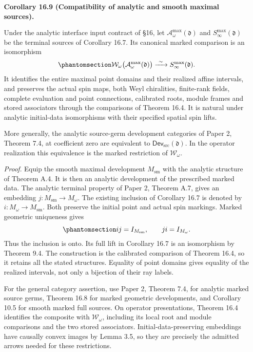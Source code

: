 \documentclass[
  english,
  11pt,
  reqno]{amsart}
\makeatletter
\newcommand{\pandocstatementheading}[1]{%
  \par\addpenalty{\@beginparpenalty}%
  \addvspace{.5\baselineskip plus .2\baselineskip minus .2\baselineskip}%
  {\normalfont\bfseries #1\par}%
  \nobreak\@afterindenttrue\@afterheading
}
\makeatother
\begin{document}
\pandocstatementheading{\protect{}\label{cor:analytic-smooth-maximal-source-isomorphism}Corollary 16.9 (Compatibility of analytic and smooth maximal sources).}

Under the analytic interface input contract of §16, let
\(\mathcal A^{\max}_\omega(\mathfrak d)\) and
\(S^{\max}_\infty(\mathfrak d)\) be the terminal sources of Corollary
16.7. Its canonical marked comparison is an isomorphism
\begin{equation}\protect\phantomsection\label{eq:analytic-smooth-maximal-source-isomorphism}{
\mathcal W_\omega\bigl(\mathcal A^{\max}_\omega(\mathfrak d)\bigr)
\xrightarrow{\ \sim\ }
S^{\max}_\infty(\mathfrak d).
}\end{equation} It identifies the entire maximal point domains and their
realized affine intervals, and preserves the actual spin maps, both Weyl
chiralities, finite-rank fields, complete evaluation and point
connections, calibrated roots, module frames and stored associators
through the comparisons of Theorem 16.4. It is natural under analytic
initial-data isomorphisms with their specified spatial spin lifts.

More generally, the analytic source-germ development categories of Paper
2, Theorem 7.4, at coefficient zero are equivalent to
\(\mathsf{Dev}_{\mathrm{src}}(\mathfrak d)\). In the operator
realization this equivalence is the marked restriction of
\(\mathcal W_\omega\).

\emph{Proof.} Equip the smooth maximal development \(M_{\mathrm{sm}}\)
with the analytic structure of Theorem A.4. It is then an analytic
development of the prescribed marked data. The analytic terminal
property of Paper 2, Theorem A.7, gives an embedding
\(j:M_{\mathrm{sm}}\to M_\omega\). The existing inclusion of Corollary
16.7 is denoted by \(i:M_\omega\to M_{\mathrm{sm}}\). Both preserve the
initial point and actual spin markings. Marked geometric uniqueness
gives
\begin{equation}\protect\phantomsection\label{eq:analytic-smooth-terminal-inverses}{
ij=I_{M_{\mathrm{sm}}},
\qquad
ji=I_{M_\omega}.
}\end{equation} Thus the inclusion is onto. Its full lift in Corollary
16.7 is an isomorphism by Theorem 9.4. The construction is the
calibrated comparison of Theorem 16.4, so it retains all the stated
structures. Equality of point domains gives equality of the realized
intervals, not only a bijection of their ray labels.

For the general category assertion, use Paper 2, Theorem 7.4, for
analytic marked source germs, Theorem 16.8 for marked geometric
developments, and Corollary 10.5 for smooth marked full sources. On
operator presentations, Theorem 16.4 identifies the composite with
\(\mathcal W_\omega\), including its local root and module comparisons
and the two stored associators. Initial-data-preserving embeddings have
causally convex images by Lemma 3.5, so they are precisely the admitted
arrows needed for these restrictions.
\end{document}
